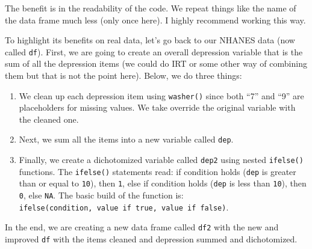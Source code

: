 \documentclass[]{tufte-book}
\providecommand{\tightlist}{%
  \setlength{\itemsep}{0pt}\setlength{\parskip}{0pt}}
\theoremstyle{definition}
\theoremstyle{definition}
\theoremstyle{remark}
\begin{document}
The benefit is in the readability of the code. We repeat things like the
name of the data frame much less (only once here). I highly recommend
working this way.

To highlight its benefits on real data, let's go back to our NHANES data
(now called \texttt{df}). First, we are going to create an overall
depression variable that is the sum of all the depression items (we
could do IRT or some other way of combining them but that is not the
point here). Below, we do three things:

\begin{enumerate}
\def\labelenumi{\arabic{enumi}.}
\tightlist
\item
  We clean up each depression item using \texttt{washer()} since both
  ``7'' and ``9'' are placeholders for missing values. We take override
  the original variable with the cleaned one.
\item
  Next, we sum all the items into a new variable called \texttt{dep}.
\item
  Finally, we create a dichotomized variable called \texttt{dep2} using
  nested \texttt{ifelse()} functions. The \texttt{ifelse()} statements
  read: if condition holds (\texttt{dep} is greater than or equal to
  \texttt{10}), then \texttt{1}, else if condition holds (\texttt{dep}
  is less than \texttt{10}), then \texttt{0}, else \texttt{NA}. The
  basic build of the function is:
  \texttt{ifelse(condition,\ value\ if\ true,\ value\ if\ false)}.
\end{enumerate}

In the end, we are creating a new data frame called \texttt{df2} with
the new and improved \texttt{df} with the items cleaned and depression
summed and dichotomized.
\end{document}
